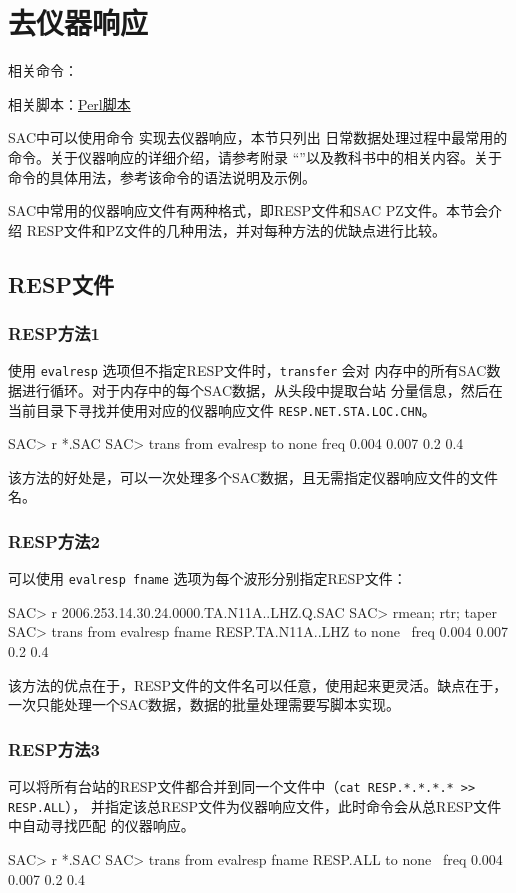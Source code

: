 \section{去仪器响应}
\label{sec:instrument-response}
相关命令：

相关脚本：\hyperref[subsec:transfer-perl]{Perl脚本}

SAC中可以使用命令  实现去仪器响应，本节只列出
日常数据处理过程中最常用的命令。关于仪器响应的详细介绍，请参考附录
``''以及教科书中的相关内容。关于 
命令的具体用法，参考该命令的语法说明及示例。

SAC中常用的仪器响应文件有两种格式，即RESP文件和SAC PZ文件。本节会介绍
RESP文件和PZ文件的几种用法，并对每种方法的优缺点进行比较。

\subsection{RESP文件}

\subsubsection{RESP方法1}
使用 \texttt{evalresp} 选项但不指定RESP文件时，\texttt{transfer} 会对
内存中的所有SAC数据进行循环。对于内存中的每个SAC数据，从头段中提取台站
分量信息，然后在当前目录下寻找并使用对应的仪器响应文件
\texttt{RESP.NET.STA.LOC.CHN}。
\begin{SACCode}
SAC> r *.SAC
SAC> trans from evalresp to none freq 0.004 0.007 0.2 0.4
\end{SACCode}
该方法的好处是，可以一次处理多个SAC数据，且无需指定仪器响应文件的文件名。

\subsubsection{RESP方法2}
可以使用 \texttt{evalresp fname} 选项为每个波形分别指定RESP文件：
\begin{SACCode}
SAC> r 2006.253.14.30.24.0000.TA.N11A..LHZ.Q.SAC
SAC> rmean; rtr; taper
SAC> trans from evalresp fname RESP.TA.N11A..LHZ to none \
                                freq 0.004 0.007 0.2 0.4
\end{SACCode}
该方法的优点在于，RESP文件的文件名可以任意，使用起来更灵活。缺点在于，
一次只能处理一个SAC数据，数据的批量处理需要写脚本实现。

\subsubsection{RESP方法3}
可以将所有台站的RESP文件都合并到同一个文件中（\texttt{cat RESP.*.*.*.* >> RESP.ALL}），
并指定该总RESP文件为仪器响应文件，此时命令会从总RESP文件中自动寻找匹配
的仪器响应。
\begin{SACCode}
SAC> r *.SAC
SAC> trans from evalresp fname RESP.ALL to none \
                            freq 0.004 0.007 0.2 0.4
\end{SACCode}

